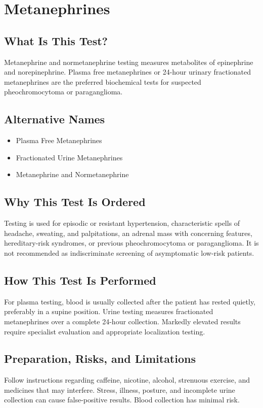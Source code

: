 \chapter{Metanephrines}

\section*{What Is This Test?}
Metanephrine and normetanephrine testing measures metabolites of epinephrine and norepinephrine. Plasma free metanephrines or 24-hour urinary fractionated metanephrines are the preferred biochemical tests for suspected pheochromocytoma or paraganglioma.

\section*{Alternative Names}
\begin{itemize}
  \item Plasma Free Metanephrines
  \item Fractionated Urine Metanephrines
  \item Metanephrine and Normetanephrine
\end{itemize}
\section*{Why This Test Is Ordered}
Testing is used for episodic or resistant hypertension, characteristic spells of headache, sweating, and palpitations, an adrenal mass with concerning features, hereditary-risk syndromes, or previous pheochromocytoma or paraganglioma. It is not recommended as indiscriminate screening of asymptomatic low-risk patients.

\section*{How This Test Is Performed}
For plasma testing, blood is usually collected after the patient has rested quietly, preferably in a supine position. Urine testing measures fractionated metanephrines over a complete 24-hour collection. Markedly elevated results require specialist evaluation and appropriate localization testing.

\section*{Preparation, Risks, and Limitations}
Follow instructions regarding caffeine, nicotine, alcohol, strenuous exercise, and medicines that may interfere. Stress, illness, posture, and incomplete urine collection can cause false-positive results. Blood collection has minimal risk.

